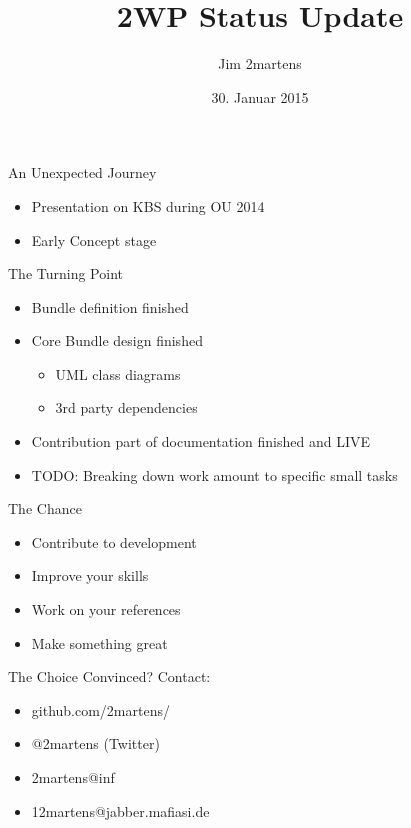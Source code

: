 \documentclass{beamer}
\begin{document}
\author{Jim 2martens}
\title{2WP Status Update}
\date{30. Januar 2015}

\begin{frame}
  \titlepage
\end{frame}

\begin{frame}{An Unexpected Journey}
  \begin{itemize}
    \vfill
    \item Presentation on KBS during OU 2014
    \vfill
    \item Early Concept stage
    \vfill
  \end{itemize}
\end{frame}

\begin{frame}{The Turning Point}
  \begin{itemize}
    \vfill
    \item Bundle definition finished
    \vfill
    \item Core Bundle design finished
    \begin{itemize}
      \item UML class diagrams
      \item 3rd party dependencies
    \end{itemize}
    \vfill
    \item Contribution part of documentation finished and LIVE
    \vfill
    \item TODO: Breaking down work amount to specific small tasks
    \vfill
  \end{itemize}
\end{frame}

\begin{frame}{The Chance}
  \begin{itemize}
    \vfill
    \item Contribute to development
    \vfill
    \item Improve your skills
    \vfill
    \item Work on your references
    \vfill
    \item Make something great
    \vfill
  \end{itemize}
\end{frame}

\begin{frame}{The Choice}
  Convinced?
  \vfill
  Contact:
  \begin{itemize}
    \item github.com/2martens/
    \item @2martens (Twitter)
    \item 2martens@inf
    \item 12martens@jabber.mafiasi.de
  \end{itemize}
\end{frame}
\end{document}
